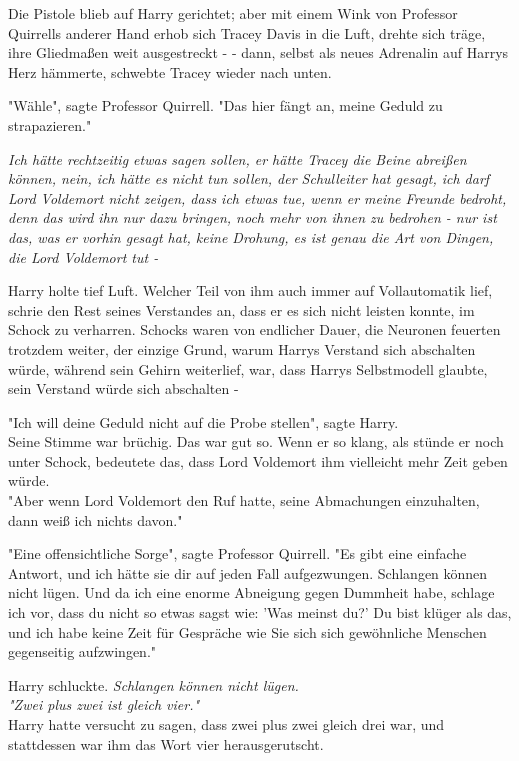 {Die Pistole blieb auf Harry gerichtet; aber mit einem Wink von Professor Quirrells anderer Hand erhob sich Tracey Davis in die Luft, drehte sich träge, ihre Gliedmaßen weit ausgestreckt - - dann, selbst als neues Adrenalin auf Harrys Herz hämmerte, schwebte Tracey wieder nach unten.

"Wähle", sagte Professor Quirrell. "Das hier fängt an, meine Geduld zu strapazieren."

\emph{Ich hätte rechtzeitig etwas sagen sollen, er hätte Tracey die Beine abreißen können, nein, ich hätte es nicht tun sollen, der Schulleiter hat gesagt, ich darf Lord Voldemort nicht zeigen, dass ich etwas tue, wenn er meine Freunde bedroht, denn das wird ihn nur dazu bringen, noch mehr von ihnen zu bedrohen - nur ist das, was er vorhin gesagt hat, keine Drohung, es ist genau die Art von Dingen, die Lord Voldemort tut -}

Harry holte tief Luft. Welcher Teil von ihm auch immer auf Vollautomatik lief, schrie den Rest seines Verstandes an, dass er es sich nicht leisten konnte, im Schock zu verharren. Schocks waren von endlicher Dauer, die Neuronen feuerten trotzdem weiter, der einzige Grund, warum Harrys Verstand sich abschalten würde, während sein Gehirn weiterlief, war, dass Harrys Selbstmodell glaubte, sein Verstand würde sich abschalten -

"Ich will deine Geduld nicht auf die Probe stellen", sagte Harry.\\ Seine Stimme war brüchig. Das war gut so. Wenn er so klang, als stünde er noch unter Schock, bedeutete das, dass Lord Voldemort ihm vielleicht mehr Zeit geben würde.\\ "Aber wenn Lord Voldemort den Ruf hatte, seine Abmachungen einzuhalten, dann weiß ich nichts davon."

"Eine offensichtliche Sorge", sagte Professor Quirrell. "Es gibt eine einfache Antwort, und ich hätte sie dir auf jeden Fall aufgezwungen. Schlangen können nicht lügen. Und da ich eine enorme Abneigung gegen Dummheit habe, schlage ich vor, dass du nicht so etwas sagst wie: 'Was meinst du?' Du bist klüger als das, und ich habe keine Zeit für Gespräche wie Sie sich sich gewöhnliche Menschen gegenseitig aufzwingen."

Harry schluckte. \emph{Schlangen können nicht lügen.}\\ \emph{"Zwei plus zwei ist gleich vier."}\\ Harry hatte versucht zu sagen, dass zwei plus zwei gleich drei war, und stattdessen war ihm das Wort vier herausgerutscht.

}
